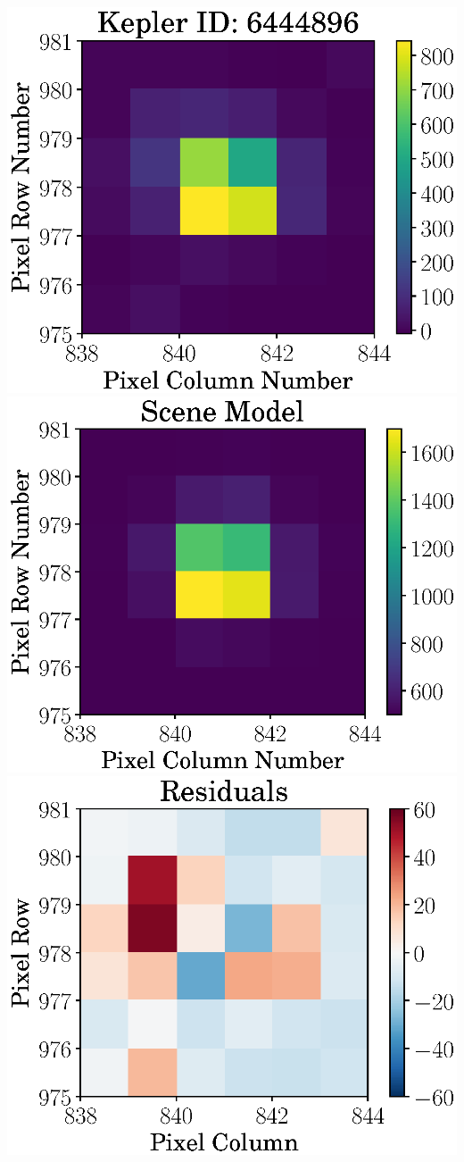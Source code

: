 \documentclass[landscape,a0b,final]{a0poster}
\newenvironment{poster}{
  \begin{center}
  \begin{minipage}[c]{0.98\textwidth}
}{
  \end{minipage}
  \end{center}
}
\newenvironment{pcolumn}[1]{
  \begin{minipage}{#1\textwidth}
  \begin{center}
}{
  \end{center}
  \end{minipage}
}
\begin{document}
\begin{poster}
\begin{center}
\begin{pcolumn}{0.32}
{\includegraphics[width=16cm,angle=0]{figs/tpf_kep.eps}
    \includegraphics[width=16cm,angle=0]{figs/model_kep.eps}
    \includegraphics[width=16cm,angle=0]{figs/residuals_kep.eps}
}
\end{pcolumn}
\end{center}
\end{poster}
\end{document}
